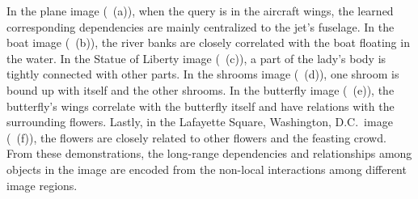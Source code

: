 	In the plane image (~(a)), when the query is in the aircraft wings, the learned corresponding dependencies are mainly centralized to the jet's fuselage. In the boat image (~(b)), the river banks are closely correlated with the boat floating in the water. In the Statue of Liberty image (~(c)), a part of the lady's body is tightly connected with other parts. In the shrooms image (~(d)), one shroom is bound up with itself and the other shrooms. In the butterfly image (~(e)), the butterfly's wings correlate with the butterfly itself and have relations with the surrounding flowers. Lastly, in the Lafayette Square, Washington, D.C.~image (~(f)), the flowers are closely related to other flowers and the feasting crowd. From these demonstrations, the long-range dependencies and relationships among objects in the image are encoded from the non-local interactions among different image regions.
